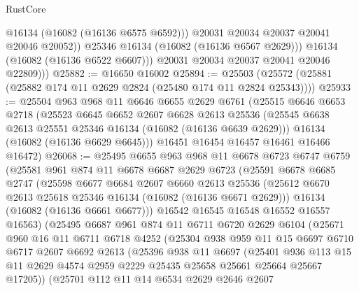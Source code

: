 \begin{lexlean}{RustCore}
\begin{coremodule}
                    @16134
                    (@16082 (@16136 @6575 @6592)))
                  @20031
                  @20034
                  @20037
                  @20041
                  @20046
                  @20052))
              @25346
              @16134
              (@16082 (@16136 @6567 @2629)))
            @16134
            (@16082 (@16136 @6522 @6607)))
          @20031
          @20034
          @20037
          @20041
          @20046
          @22809)))
@25882 := @16650 @16002
@25894 := @25503 (@25572 (@25881 (@25882 @174 @11 @2629 @2824 (@25480 @174 @11 @2824 @25343))))
@25933 := @25504
    @963
    @968
    @11
    @6646
    @6655
    @2629
    @6761
    (@25515
      @6646
      @6653
      @2718
      (@25523
        @6645
        @6652
        @2607
        @6628
        @2613
        @25536
        (@25545 @6638 @2613 @25551 @25346 @16134 (@16082 (@16136 @6639 @2629)))
        @16134
        (@16082 (@16136 @6629 @6645)))
      @16451
      @16454
      @16457
      @16461
      @16466
      @16472)
@26068 := @25495
    @6655
    @963
    @968
    @11
    @6678
    @6723
    @6747
    @6759
    (@25581
      @961
      @874
      @11
      @6678
      @6687
      @2629
      @6723
      (@25591
        @6678
        @6685
        @2747
        (@25598
          @6677
          @6684
          @2607
          @6660
          @2613
          @25536
          (@25612 @6670 @2613 @25618 @25346 @16134 (@16082 (@16136 @6671 @2629)))
          @16134
          (@16082 (@16136 @6661 @6677)))
        @16542
        @16545
        @16548
        @16552
        @16557
        @16563)
      (@25495
        @6687
        @961
        @874
        @11
        @6711
        @6720
        @2629
        @6104
        (@25671
          @960
          @16
          @11
          @6711
          @6718
          @4252
          (@25304
            @938
            @959
            @11
            @15
            @6697
            @6710
            @6717
            @2607
            @6692
            @2613
            (@25396
              @938
              @11
              @6697
              (@25401
                @936
                @113
                @15
                @11
                @2629
                @4574
                @2959
                @2229
                @25435
                @25658
                @25661
                @25664
                @25667
                @17205))
            (@25701
              @112
              @11
              @14
              @6534
              @2629
              @2646
              @2607

\end{coremodule}
\end{lexlean}
